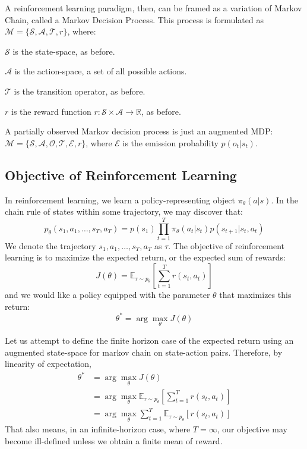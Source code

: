 A reinforcement learning paradigm, then, can be framed as a variation of Markov Chain, called a Markov Decision Process.
This process is formulated as $\mathcal{M} = \{\mathcal{S}, \mathcal{A}, \mathcal{T}, r\}$, where:
\begin{bindenum}
    \item $\mathcal{S}$ is the state-space, as before.
    \item $\mathcal{A}$ is the action-space, a set of all possible actions.
    \item $\mathcal{T}$ is the transition operator, as before.
    \item $r$ is the reward function $r: \mathcal{S} \times \mathcal{A} \rightarrow \mathbb{R}$, as before.
\end{bindenum}
A partially observed Markov decision process is just an augmented MDP: $\mathcal{M} = \{ \mathcal{S}, \mathcal{A}, \mathcal{O}, \mathcal{T}, \mathcal{E}, r\}$, where $\mathcal{E}$ is the emission probability $p(o_t | s_t)$.

\subsection{Objective of Reinforcement Learning}
In reinforcement learning, we learn a policy-representing object $\pi_\theta (a|s)$.
In the chain rule of states within some trajectory, we may discover that:
\[
    p_\theta (s_1, a_1, \dots, s_T, a_T) = p(s_1) \prod_{t=1}^T \pi_\theta (a_t | s_t) p(s_{t+1} | s_t, a_t)
\]
We denote the trajectory $s_1, a_1, \dots, s_T, a_T$ as $\tau$.
The objective of reinforcement learning is to maximize the expected return, or the expected sum of rewards:
\[
    J(\theta) = \mathbb{E}_{\tau \sim p_\theta} \left[ \sum_{t=1}^T r(s_t, a_t) \right]
\]
and we would like a policy equipped with the parameter $\theta$ that maximizes this return:
\[
    \theta^* = \arg \max_\theta J(\theta)
\]

Let us attempt to define the finite horizon case of the expected return using an augmented state-space for markov chain on state-action pairs.
Therefore, by linearity of expectation,
\begin{align*}
    \theta^* &= \arg \max_\theta J(\theta) \\
    &= \arg \max_\theta \mathbb{E}_{\tau \sim p_\theta} \left[ \sum_{t=1}^T r(s_t, a_t) \right] \\
    &= \arg \max_\theta \sum_{t=1}^T \mathbb{E}_{\tau \sim p_\theta} \left[ r(s_t, a_t) \right]
\end{align*}
That also means, in an infinite-horizon case, where $T = \infty$, our objective may become ill-defined unless we obtain a finite mean of reward.

